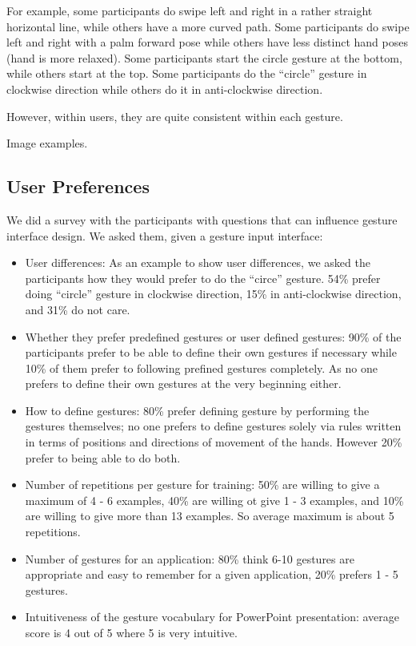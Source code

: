 For example, some participants do swipe left and right in a rather straight
horizontal line, while others have a more curved path.  Some
participants do swipe left and right with a palm forward pose while others have
less distinct hand poses (hand is more relaxed). Some participants start
the circle gesture at the bottom, while others start at the top. Some
participants do the ``circle'' gesture in clockwise direction while others do it
in anti-clockwise direction.

However, within users, they are
quite consistent within each gesture. 

Image examples.

\subsection{User Preferences}
We did a survey with the participants with questions that can influence
gesture interface design. We asked them, given a gesture input interface:
\begin{itemize}
  \item User differences: As an example to show user differences, we asked
  the participants how they would prefer to do the ``circe'' gesture. 54\%
  prefer doing ``circle'' gesture in clockwise direction, 15\% in anti-clockwise
  direction, and 31\% do not care.
  \item Whether they prefer predefined gestures or user defined gestures: 90\%
  of the participants prefer to be able to define their own gestures if necessary while 10\% of them prefer to following prefined
gestures completely. As no one prefers to define their own gestures at the very
beginning either.
\item How to define gestures: 80\% prefer defining gesture by 
performing the gestures themselves; no one prefers to
define gestures solely via rules written in terms of positions and directions
of movement of the hands.
However 20\% prefer to being able to do both.
\item Number of repetitions per gesture for training: 50\% are willing to give a
maximum of 4 - 6 examples, 40\% are willing ot give 1 - 3 examples, and 10\% are
willing to give more than 13 examples. So average maximum is about 5
repetitions.
\item Number of gestures for an application: 80\% think 6-10 gestures are
appropriate and easy to remember for a given application, 20\% prefers 1 - 5
gestures.
\item Intuitiveness of the gesture vocabulary for PowerPoint presentation:
average score is 4 out of 5 where 5 is very intuitive.
\end{itemize}

